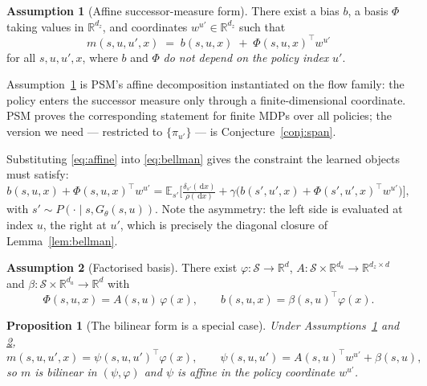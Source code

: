\documentclass[11pt]{article}
\theoremstyle{plain}
\newtheorem{proposition}[lemma]{Proposition}
\theoremstyle{definition}
\newtheorem{assumption}{Assumption}
\theoremstyle{remark}
\newcommand{\Sspace}{\mathcal S}
\newcommand{\R}{\mathbb R}
\newcommand{\E}{\mathbb E}
\newcommand{\1}{\mathbf 1}
\newcommand{\dd}{\,\mathrm d}
\newcommand{\Gth}{G_\theta}
\begin{document}
\begin{assumption}[Affine successor-measure form]
\label{ass:affine}
There exist a bias $b$, a basis $\Phi$ taking values in $\R^{d_z}$, and coordinates
$w^{u'}\in\R^{d_z}$ such that
\begin{equation}
\label{eq:affine}
  m(s,u,u',x)\;=\;b(s,u,x)\;+\;\Phi(s,u,x)^\top w^{u'}
\end{equation}
for all $s,u,u',x$, where $b$ and $\Phi$ \emph{do not depend on the policy index} $u'$.
\end{assumption}

\noindent
Assumption~\ref{ass:affine} is PSM's affine decomposition instantiated on the flow family:
the policy enters the successor measure only through a finite-dimensional coordinate. PSM
proves the corresponding statement for finite MDPs over all policies; the version we need
--- restricted to $\{\pi_{u'}\}$ --- is Conjecture~\ref{conj:span}.

Substituting \eqref{eq:affine} into \eqref{eq:bellman} gives the constraint the learned
objects must satisfy:
\begin{equation}
\label{eq:bellman-affine}
  b(s,u,x)+\Phi(s,u,x)^\top w^{u'}
  =\E_{s'}\Big[\tfrac{\delta_{s'}(\dd x)}{\rho(\dd x)}
   +\gamma\big(b(s',u',x)+\Phi(s',u',x)^\top w^{u'}\big)\Big],
\end{equation}
with $s'\sim P(\cdot\mid s,\Gth(s,u))$. Note the asymmetry: the left side is evaluated at
index $u$, the right at $u'$, which is precisely the diagonal closure of
Lemma~\ref{lem:bellman}.

\begin{assumption}[Factorised basis]
\label{ass:factorised}
There exist $\varphi:\Sspace\to\R^{d}$, $A:\Sspace\times\R^{d_a}\to\R^{d_z\times d}$ and
$\beta:\Sspace\times\R^{d_a}\to\R^{d}$ with
\[
  \Phi(s,u,x)=A(s,u)\,\varphi(x),
  \qquad
  b(s,u,x)=\beta(s,u)^\top\varphi(x).
\]
\end{assumption}

\begin{proposition}[The bilinear form is a special case]
\label{prop:bilinear}
Under Assumptions~\ref{ass:affine} and \ref{ass:factorised},
\begin{equation}
\label{eq:bilinear}
  m(s,u,u',x)=\psi(s,u,u')^\top\varphi(x),
  \qquad
  \psi(s,u,u')=A(s,u)^\top w^{u'}+\beta(s,u),
\end{equation}
so $m$ is bilinear in $(\psi,\varphi)$ and $\psi$ is \emph{affine in the policy coordinate}
$w^{u'}$.
\end{proposition}
\end{document}
